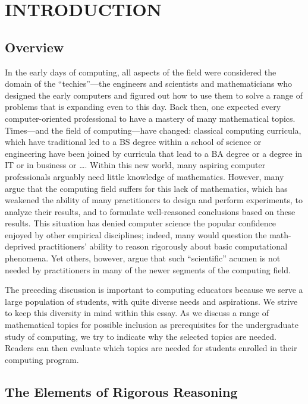 
\chapter{INTRODUCTION}

\section{Overview}

In the early days of computing, all aspects of the field were
considered the domain of the ``techies''---the engineers and
scientists and mathematicians who designed the early computers and
figured out how to use them to solve a range of problems that is
expanding even to this day.  Back then, one expected every
computer-oriented professional to have a mastery of many mathematical
topics.  Times---and the field of computing---have changed: classical
computing curricula, which have traditional led to a BS degree within
a school of science or engineering have been joined by curricula that
lead to a BA degree or a degree in IT or in business or \ldots.
Within this new world, many aspiring computer professionals arguably
need little knowledge of mathematics.  However, many argue that the
computing field suffers for this lack of mathematics, which has
weakened the ability of many practitioners to design and perform
experiments, to analyze their results, and to formulate well-reasoned
conclusions based on these results.  This situation has denied
computer science the popular confidence enjoyed by other empirical
disciplines; indeed, many would question the math-deprived
practitioners' ability to reason rigorously about basic computational
phenomena.  Yet others, however, argue that such ``scientific'' acumen
is not needed by practitioners in many of the newer segments of the
computing field.

The preceding discussion is important to computing educators because
we serve a large population of students, with quite diverse needs and
aspirations.  We strive to keep this diversity in mind within this
essay.  As we discuss a range of mathematical topics for possible
inclusion as prerequisites for the undergraduate study of computing,
we try to indicate why the selected topics are needed.  Readers can
then evaluate which topics are needed for students enrolled in their
computing program.

\section{The Elements of Rigorous Reasoning}


